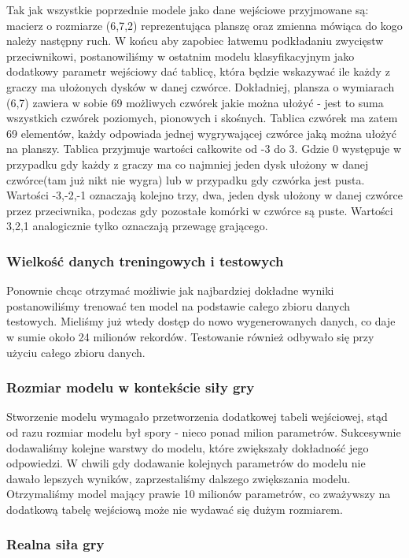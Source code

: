 \documentclass[12pt]{article}
\begin{document}
Tak jak wszystkie poprzednie modele jako dane wejściowe przyjmowane są: macierz o rozmiarze (6,7,2) reprezentująca planszę oraz zmienna mówiąca do kogo należy następny ruch. W końcu aby zapobiec łatwemu podkładaniu zwycięstw przeciwnikowi, postanowiliśmy w ostatnim modelu klasyfikacyjnym jako dodatkowy parametr wejściowy dać tablicę, która będzie wskazywać ile każdy z graczy ma ułożonych dysków w danej czwórce. Dokładniej, plansza o wymiarach (6,7) zawiera w sobie 69 możliwych czwórek jakie można ułożyć - jest to suma wszystkich czwórek poziomych, pionowych i skośnych. Tablica czwórek ma zatem 69 elementów, każdy odpowiada jednej wygrywającej czwórce jaką można ułożyć na planszy. Tablica przyjmuje wartości całkowite od -3 do 3. Gdzie 0 występuje w przypadku gdy każdy z graczy ma co najmniej jeden dysk ułożony w danej czwórce(tam już nikt nie wygra) lub w przypadku gdy czwórka jest pusta. Wartości -3,-2,-1 oznaczają kolejno trzy, dwa, jeden dysk ułożony w danej czwórce przez przeciwnika, podczas gdy pozostałe komórki w czwórce są puste. Wartości 3,2,1 analogicznie tylko oznaczają przewagę grającego.

\subsubsection{Wielkość danych treningowych i testowych}

Ponownie chcąc otrzymać możliwie jak najbardziej dokładne wyniki postanowiliśmy trenować ten model na podstawie całego zbioru danych testowych. Mieliśmy już wtedy dostęp do nowo wygenerowanych danych, co daje w sumie około 24 milionów rekordów. Testowanie również odbywało się przy użyciu całego zbioru danych.

\subsubsection{Rozmiar modelu w kontekście siły gry}

Stworzenie modelu wymagało przetworzenia dodatkowej tabeli wejściowej, stąd od razu rozmiar modelu był spory - nieco ponad milion parametrów. Sukcesywnie dodawaliśmy kolejne warstwy do modelu, które zwiększały dokładność jego odpowiedzi. W chwili gdy dodawanie kolejnych parametrów do modelu nie dawało lepszych wyników, zaprzestaliśmy dalszego zwiększania modelu. Otrzymaliśmy model mający prawie 10 milionów parametrów, co zważywszy na dodatkową tabelę wejściową może nie wydawać się dużym rozmiarem.

\subsubsection{Realna siła gry}
\end{document}
